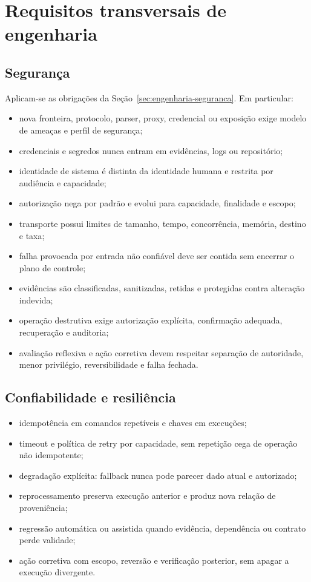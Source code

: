 \documentclass[11pt,a4paper,oneside]{article}
\begin{document}
\section{Requisitos transversais de engenharia}

\subsection{Segurança}
Aplicam-se as obrigações da Seção~\ref{sec:engenharia-seguranca}. Em particular:
\begin{itemize}
  \item nova fronteira, protocolo, parser, proxy, credencial ou exposição exige modelo de ameaças e perfil de segurança;
  \item credenciais e segredos nunca entram em evidências, logs ou repositório;
  \item identidade de sistema é distinta da identidade humana e restrita por audiência e capacidade;
  \item autorização nega por padrão e evolui para capacidade, finalidade e escopo;
  \item transporte possui limites de tamanho, tempo, concorrência, memória, destino e taxa;
  \item falha provocada por entrada não confiável deve ser contida sem encerrar o plano de controle;
  \item evidências são classificadas, sanitizadas, retidas e protegidas contra alteração indevida;
  \item operação destrutiva exige autorização explícita, confirmação adequada, recuperação e auditoria;
  \item avaliação reflexiva e ação corretiva devem respeitar separação de autoridade, menor privilégio, reversibilidade e falha fechada.
\end{itemize}

\subsection{Confiabilidade e resiliência}
\begin{itemize}
  \item idempotência em comandos repetíveis e chaves em execuções;
  \item timeout e política de retry por capacidade, sem repetição cega de operação não idempotente;
  \item degradação explícita: fallback nunca pode parecer dado atual e autorizado;
  \item reprocessamento preserva execução anterior e produz nova relação de proveniência;
  \item regressão automática ou assistida quando evidência, dependência ou contrato perde validade;
  \item ação corretiva com escopo, reversão e verificação posterior, sem apagar a execução divergente.
\end{itemize}
\end{document}

